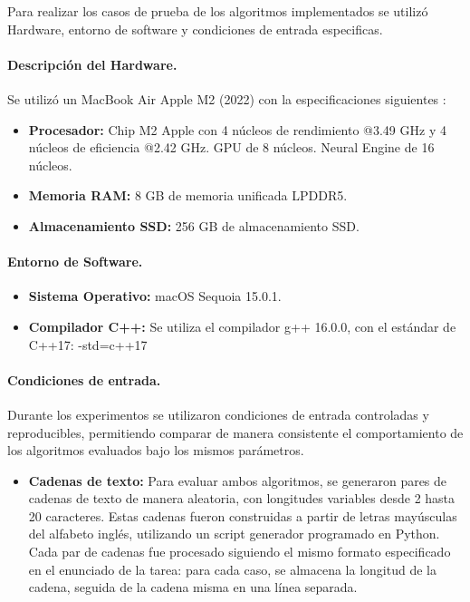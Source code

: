 Para realizar los casos de prueba de los algoritmos implementados se utilizó Hardware, entorno de software y condiciones de entrada especificas.

\paragraph{\textbf{Descripción del Hardware.}
} \leavevmode

Se utilizó un MacBook Air Apple M2 (2022) con la especificaciones siguientes \cite{apple2024macbook}:
\begin{itemize}
    \item \textbf{Procesador:} Chip M2 Apple con 4 núcleos de rendimiento @3.49 GHz y 4 núcleos de eficiencia @2.42 GHz. GPU de 8 núcleos. Neural Engine de 16 núcleos.
    \item \textbf{Memoria RAM:} 8 GB de memoria unificada LPDDR5.
    \item \textbf{Almacenamiento SSD:} 256 GB de almacenamiento SSD.
\end{itemize}

\paragraph{\textbf{Entorno de Software.}
} \leavevmode

\begin{itemize}
    \item \textbf{Sistema Operativo:} macOS Sequoia 15.0.1.
    \item \textbf{Compilador C++:} Se utiliza el compilador g++ 16.0.0, con el estándar de C++17: -std=c++17
\end{itemize}

\paragraph{\textbf{Condiciones de entrada.}} \leavevmode

Durante los experimentos se utilizaron condiciones de entrada controladas y reproducibles, permitiendo comparar de manera consistente el comportamiento de los algoritmos evaluados bajo los mismos parámetros.

\begin{itemize}
    \item \textbf{Cadenas de texto:} Para evaluar ambos algoritmos, se generaron pares de cadenas de texto de manera aleatoria, con longitudes variables desde 2 hasta 20 caracteres. Estas cadenas fueron construidas a partir de letras mayúsculas del alfabeto inglés, utilizando un script generador programado en Python. Cada par de cadenas fue procesado siguiendo el mismo formato especificado en el enunciado de la tarea: para cada caso, se almacena la longitud de la cadena, seguida de la cadena misma en una línea separada.
\end{itemize}